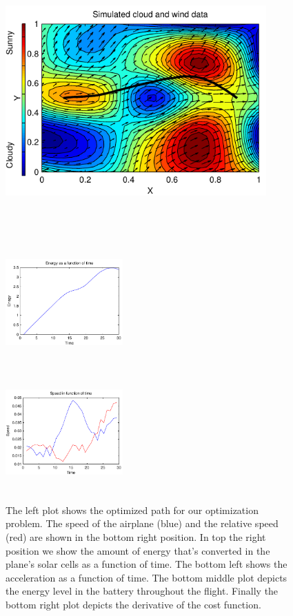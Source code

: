 \begin{figure}[width=15cm]
\begin{minipage}[c][11cm][t]{0.5\textwidth}
  \vspace*{\fill}
  \centering
  \includegraphics[width=10cm,height=10cm]{../src/plot/fancy/path}
  \label{fig:test1}
\end{minipage}%
\begin{minipage}[c][11cm][t]{.5\textwidth}
  \vspace*{\fill}
  \centering
  \includegraphics[width=4.5cm,height=4.5cm]{../src/plot/fancy/Energy}
  \label{fig:test2}\par\vfill
  \includegraphics[width=4.5cm,height=4.5cm]{../src/plot/fancy/speed}
  \label{fig:test3}
\end{minipage}
\caption{The left plot shows the optimized path for our optimization problem. The speed of the airplane (blue) and the relative speed (red) are shown in the bottom right position. In top the right position we show the amount of energy that's converted in the plane's solar cells as a function of time. The bottom left shows the acceleration as a function of time. The bottom middle plot depicts the energy level in the battery throughout the flight. Finally the bottom right plot depicts the derivative of the cost function.}
\label{fig:badPlot}
\end{figure}

